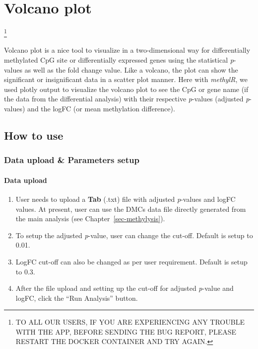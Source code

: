 \documentclass[
  a4paper,
  DIV=11,
  numbers=noendperiod,
  oneside,
  open=any]{scrreport}
\providecommand{\tightlist}{%
  \setlength{\itemsep}{0pt}\setlength{\parskip}{0pt}}\usepackage{longtable,booktabs,array}
\begin{document}
\chapter{Volcano plot}\label{sec-volcano}

\footnote{TO ALL OUR USERS, IF YOU ARE EXPERIENCING ANY TROUBLE WITH THE
  APP, BEFORE SENDING THE BUG REPORT, PLEASE RESTART THE DOCKER
  CONTAINER AND TRY AGAIN.}

Volcano plot is a nice tool to visualize in a two-dimensional way for
differentially methylated CpG site or differentially expressed genes
using the statistical \emph{p}-values as well as the fold change value.
Like a volcano, the plot can show the significant or insignificant data
in a scatter plot manner. Here with \emph{methylR}, we used plotly
output to visualize the volcano plot to see the CpG or gene name (if the
data from the differential analysis) with their respective
\emph{p}-values (adjusted \emph{p}-values) and the logFC (or mean
methylation difference).

\section{How to use}\label{how-to-use-5}

\subsection{Data upload \& Parameters
setup}\label{data-upload-parameters-setup-2}

\subsubsection{Data upload}\label{data-upload-2}

\begin{enumerate}
\def\labelenumi{\arabic{enumi}.}
\tightlist
\item
  User needs to upload a \textbf{Tab} (.txt) file with adjusted
  \emph{p}-values and logFC values. At present, user can use the DMCs
  data file directly generated from the main analysis (see
  Chapter~\ref{sec-methylysis}).
\item
  To setup the adjusted \emph{p}-value, user can change the cut-off.
  Default is setup to 0.01.
\item
  LogFC cut-off can also be changed as per user requirement. Default is
  setup to 0.3.
\item
  After the file upload and setting up the cut-off for adjusted
  \emph{p}-value and logFC, click the ``Run Analysis'' button.
\end{enumerate}
\end{document}
